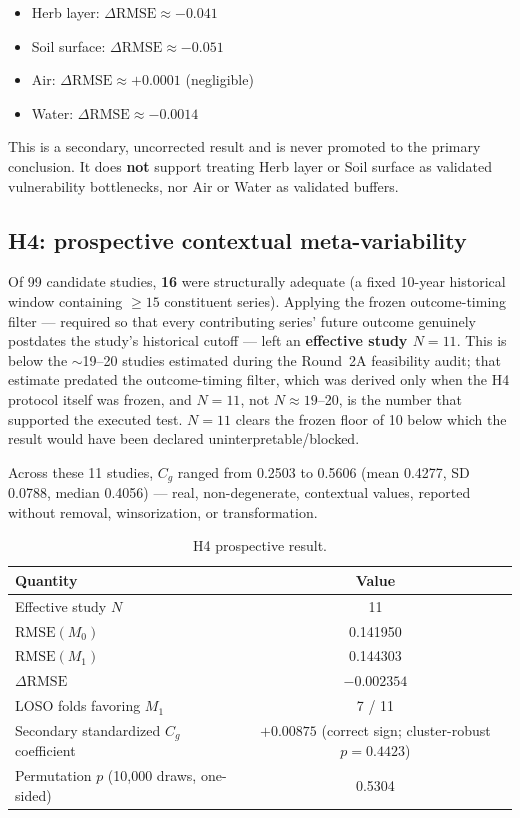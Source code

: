 \documentclass[11pt]{article}
\newcommand{\Cg}{C_g}
\newcommand{\dRMSE}{\Delta\mathrm{RMSE}}
\begin{document}
\begin{itemize}
\item Herb layer: $\dRMSE \approx -0.041$
\item Soil surface: $\dRMSE \approx -0.051$
\item Air: $\dRMSE \approx +0.0001$ (negligible)
\item Water: $\dRMSE \approx -0.0014$
\end{itemize}

This is a secondary, uncorrected result and is never promoted to the
primary conclusion. It does \textbf{not} support treating Herb layer or
Soil surface as validated vulnerability bottlenecks, nor Air or Water as
validated buffers.

\subsection{H4: prospective contextual meta-variability}

Of 99 candidate studies, \textbf{16} were structurally adequate (a fixed
10-year historical window containing $\geq 15$ constituent series).
Applying the frozen outcome-timing filter --- required so that every
contributing series' future outcome genuinely postdates the study's
historical cutoff --- left an \textbf{effective study $N=11$}. This is
below the $\sim$19--20 studies estimated during the Round~2A feasibility
audit; that estimate predated the outcome-timing filter, which was
derived only when the H4 protocol itself was frozen, and $N=11$, not
$N\approx 19$--20, is the number that supported the executed test. $N=11$
clears the frozen floor of 10 below which the result would have been
declared uninterpretable/blocked.

Across these 11 studies, $\Cg$ ranged from 0.2503 to 0.5606 (mean
0.4277, SD 0.0788, median 0.4056) --- real, non-degenerate, contextual
values, reported without removal, winsorization, or transformation.

\begin{table}[h]
\centering
\caption{H4 prospective result.}
\label{tab:h4}
\begin{tabular}{@{}lc@{}}
\toprule
Quantity & Value \\
\midrule
Effective study $N$ & 11 \\
$\mathrm{RMSE}(M_0)$ & 0.141950 \\
$\mathrm{RMSE}(M_1)$ & 0.144303 \\
$\dRMSE$ & $-0.002354$ \\
LOSO folds favoring $M_1$ & 7 / 11 \\
Secondary standardized $\Cg$ coefficient & $+0.00875$ (correct sign; cluster-robust $p=0.4423$) \\
Permutation $p$ (10{,}000 draws, one-sided) & 0.5304 \\
\bottomrule
\end{tabular}
\end{table}
\end{document}
